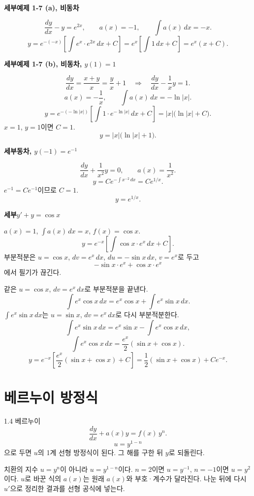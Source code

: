 \documentclass[11pt]{article}
\newcommand{\ex}[1]{\par\textbf{세부\quad #1}\par}
\begin{document}
\ex{예제 1-7 (a), 비동차}
\[
\frac{dy}{dx}-y=e^{2x},\qquad
a(x)=-1,\qquad
\int a(x)\,dx=-x.
\]
\[
y=e^{-(-x)}\left[\int e^{x}\cdot e^{2x}\,dx+C\right]
=e^{x}\left[\int 1\,dx+C\right]
=e^{x}(x+C).
\]

\ex{예제 1-7 (b), 비동차, \(y(1)=1\)}
\[
\frac{dy}{dx}=\frac{x+y}{x}
=\frac{y}{x}+1
\quad\Rightarrow\quad
\frac{dy}{dx}-\frac{1}{x}y=1.
\]
\[
a(x)=-\frac{1}{x},\qquad
\int a(x)\,dx=-\ln|x|.
\]
\[
y=e^{-(-\ln|x|)}\left[\int 1\cdot e^{-\ln|x|}\,dx+C\right]
=|x|\bigl(\ln|x|+C\bigr).
\]
\(x=1\), \(y=1\)이면 \(C=1\).
\[
y=|x|\bigl(\ln|x|+1\bigr).
\]

\ex{동차, \(y(-1)=e^{-1}\)}
\[
\frac{dy}{dx}+\frac{1}{x^{2}}y=0,\qquad a(x)=\frac{1}{x^{2}}.
\]
\[
y=Ce^{-\int x^{-2}\,dx}=Ce^{1/x}.
\]
\(e^{-1}=Ce^{-1}\)이므로 \(C=1\).
\[
y=e^{1/x}.
\]

\ex{\(y'+y=\cos x\)}
\(a(x)=1\), \(\int a(x)\,dx=x\), \(f(x)=\cos x\).
\[
y=e^{-x}\left[\int\cos x\cdot e^{x}\,dx+C\right].
\]
부분적분은 \(u=\cos x\), \(dv=e^{x}\,dx\), \(du=-\sin x\,dx\), \(v=e^{x}\)로 두고
\[
-\sin x\cdot e^{x}+\cos x\cdot e^{x}
\]
에서 필기가 끊긴다.

\begin{fillbox}
같은 \(u=\cos x\), \(dv=e^{x}\,dx\)로 부분적분을 끝낸다.
\[
\int e^{x}\cos x\,dx
=e^{x}\cos x+\int e^{x}\sin x\,dx.
\]
\(\int e^{x}\sin x\,dx\)는 \(u=\sin x\), \(dv=e^{x}\,dx\)로 다시 부분적분한다.
\[
\int e^{x}\sin x\,dx
=e^{x}\sin x-\int e^{x}\cos x\,dx,
\]
\[
\int e^{x}\cos x\,dx
=\frac{e^{x}}{2}(\sin x+\cos x).
\]
\[
y=e^{-x}\left[\frac{e^{x}}{2}(\sin x+\cos x)+C\right]
=\frac12(\sin x+\cos x)+Ce^{-x}.
\]
\end{fillbox}

\section{베르누이 방정식}

\begin{mainbox}{1.4 베르누이}
\[
\frac{dy}{dx}+a(x)y=f(x)\,y^{n}.
\]
\[
u=y^{1-n}
\]
으로 두면 \(u\)의 1계 선형 방정식이 된다. 그 해를 구한 뒤 \(y\)로 되돌린다.
\end{mainbox}

\begin{confbox}{치환의 지수}
\(u=y^{n}\)이 아니라 \(u=y^{1-n}\)이다. \(n=2\)이면 \(u=y^{-1}\), \(n=-1\)이면 \(u=y^{2}\)이다. \(u\)로 바꾼 식의 \(a(x)\)는 원래 \(a(x)\)와 부호·계수가 달라진다. 나눈 뒤에 다시 \(u'\)으로 정리한 결과를 선형 공식에 넣는다.
\end{confbox}
\end{document}
